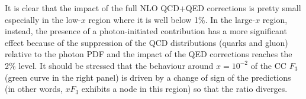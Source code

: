 
It is clear that the impact of the full NLO QCD+QED corrections is
pretty small especially in the low-$x$ region where it is well below
1\%.
%
In the large-$x$ region, instead, the presence of a
photon-initiated contribution has a more significant effect because of
the suppression of the QCD distributions (quarks and gluon) relative
to the photon PDF and the impact of the QED corrections reaches the
2\% level.
%
It should be stressed that the behaviour around
$x=10^{-2}$ of the CC $F_3$ (green curve in the right panel) is driven
by a change of sign of the predictions (in other words,
$xF_3$ exhibits a node in this region) so that the ratio diverges.

